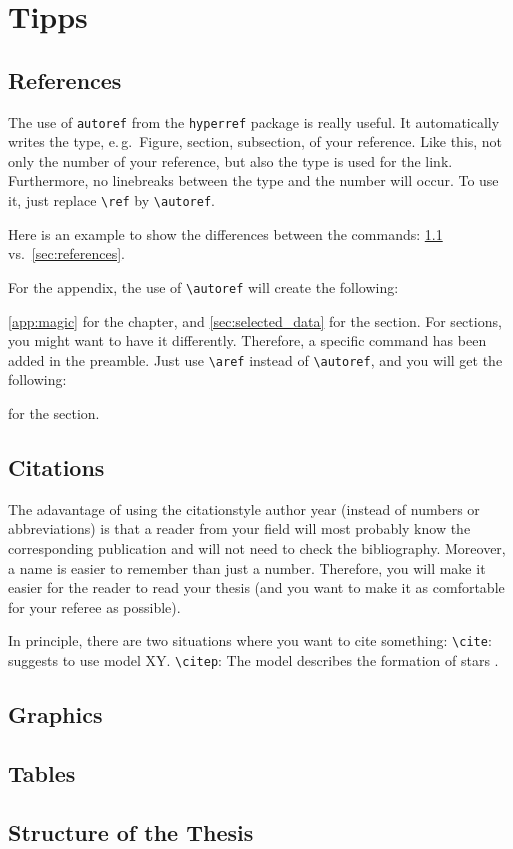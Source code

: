 \chapter{Tipps}


\section{References}
\label{sec:references}

The use of \texttt{autoref} from the \texttt{hyperref} package is really useful.
It automatically writes the type, e.\,g.\ Figure, section, subsection, of your reference.
Like this, not only the number of your reference, but also the type is used for the link.
Furthermore, no linebreaks between the type and the number will occur.
To use it, just replace \texttt{\textbackslash ref} by \texttt{\textbackslash autoref}.

Here is an example to show the differences between the commands:
\ref{sec:references} vs.\ \autoref{sec:references}.

For the appendix, the use of \texttt{\textbackslash autoref} will create the following:

\autoref{app:magic} for the chapter, and \autoref{sec:selected_data} for the section.
For sections, you might want to have it differently.
Therefore, a specific command has been added in the preamble.
Just use \texttt{\textbackslash aref} instead of \texttt{\textbackslash autoref}, and you will get the following:

 for the section.


\section{Citations}

The adavantage of using the citationstyle author year (instead of numbers or abbreviations) is that a reader from your field will most probably know the corresponding publication and will not need to check the bibliography.
Moreover, a name is easier to remember than just a number.
Therefore, you will make it easier for the reader to read your thesis (and you want to make it as comfortable for your referee as possible).

In principle, there are two situations where you want to cite something:
\texttt{\textbackslash cite}: \cite{malaga} suggests to use model XY.
\texttt{\textbackslash citep}: The model describes the formation of stars  \citep{malaga}.


\section{Graphics}

\section{Tables}

\section{Structure of the Thesis}